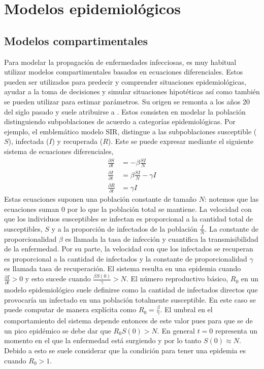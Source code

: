 \chapter{Modelos epidemiológicos} \label{chp:epi_models}

\section{Modelos compartimentales}

Para modelar la propagación de enfermedades infecciosas, es muy habitual utilizar modelos compartimentales basados en ecuaciones diferenciales. Estos pueden ser utilizados para predecir y comprender situaciones epidemiológicas, ayudar a la toma de decisiones y simular situaciones hipotéticas así como también se pueden utilizar para estimar parámetros. Su origen se remonta a los años 20 del siglo pasado y suele atribuirse a \cite{Kermack1927}. Estos consisten en modelar la población distinguiendo subpoblaciones de acuerdo a categorías epidemiológicas. Por ejemplo, el emblemático modelo SIR, distingue a las subpoblaciones susceptible ($S$), infectada ($I$) y recuperada ($R$). Este se puede expresar mediante el siguiente sistema de ecuaciones diferenciales,
\begin{align} \label{eq:sir}
    \frac{\partial S}{\partial t} &= -\beta \frac{SI}{N}\\
    \frac{\partial I}{\partial t} &= \beta \frac{SI}{N} - \gamma I \\
    \frac{\partial R}{\partial t} &= \gamma I
\end{align}
Estas ecuaciones suponen una población constante de tamaño $N$: notemos que las ecuaciones suman 0 por lo que la población total se mantiene. La velocidad con que los individuos susceptibles se infectan es proporcional a la cantidad total de susceptibles, $S$ y a la proporción de infectados de la población $\frac{I}{N}$. La constante de proporcionalidad $\beta$ es llamada la tasa de infección y cuantifica la transmisibilidad de la enfermedad. Por su parte, la velocidad con que los infectados se recuperan es proporcional a la cantidad de infectados y la constante de proporcionalidad $\gamma$ es llamada tasa de recuperación. El sistema resulta en una epidemia cuando $\frac{\partial I}{\partial t} > 0$ y esto sucede cuando $\frac{\beta S(0)}{\gamma} > N$. El número reproductivo básico, $R_0$ en un modelo epidemiológico suele definirse como la cantidad de infectados directos que provocaría un infectado en una población totalmente susceptible. En este caso se puede computar de manera explícita como $R_0 = \frac{\beta}{\gamma}$. El umbral en el comportamiento del sistema depende entonces de este valor pues para que se de un pico epidémico se debe dar que $R_0 S(0) > N$.  En general $t = 0$ representa un momento en el que la enfermedad está surgiendo y por lo tanto $S(0) \approx N$. Debido a esto se suele considerar que la condición para tener una epidemia es cuando $R_0 > 1$. 

